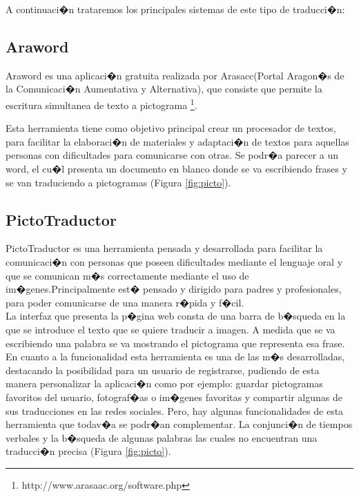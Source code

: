 A continuaci�n trataremos los principales sistemas de este tipo de traducci�n:
\subsection{Araword}
Araword es una aplicaci�n gratuita realizada por Arasacc(Portal Aragon�s de la Comunicaci�n Aumentativa y Alternativa), que consiste que permite la escritura simultanea de texto a pictograma \footnote{http://www.arasaac.org/software.php}.

Esta herramienta tiene como objetivo principal crear un procesador de textos, para facilitar la elaboraci�n de materiales y adaptaci�n de textos para aquellas personas con dificultades para comunicarse con otras. Se podr�a parecer a un word, el cu�l presenta un documento en blanco donde se va escribiendo frases y se van traduciendo a pictogramas (Figura \ref{fig:picto}).

\subsection{PictoTraductor}
PictoTraductor es una herramienta pensada y desarrollada para facilitar la comunicaci�n con personas que poseen dificultades mediante el lenguaje oral y que se comunican m�s correctamente mediante el uso de im�genes.Principalmente est� pensado y dirigido para padres y profesionales, para poder comunicarse de una manera r�pida y f�cil.\\

La interfaz que presenta la p�gina web consta de una barra de b�squeda en la que se introduce el texto que se quiere traducir a imagen. A medida que se va escribiendo una palabra se va mostrando el pictograma que representa esa frase.\\

En cuanto a la funcionalidad esta herramienta es una de las m�s desarrolladas, destacando la posibilidad para un usuario de registrarse, pudiendo de esta manera personalizar la aplicaci�n como por ejemplo: guardar pictogramas favoritos del usuario, fotograf�as o im�genes favoritas y compartir algunas de sus traducciones en las redes sociales.
Pero, hay algunas funcionalidades de esta herramienta que todav�a se podr�an complementar. La conjunci�n de tiempos verbales y la b�squeda de algunas palabras las cuales no encuentran una traducci�n precisa (Figura \ref{fig:picto}). 


